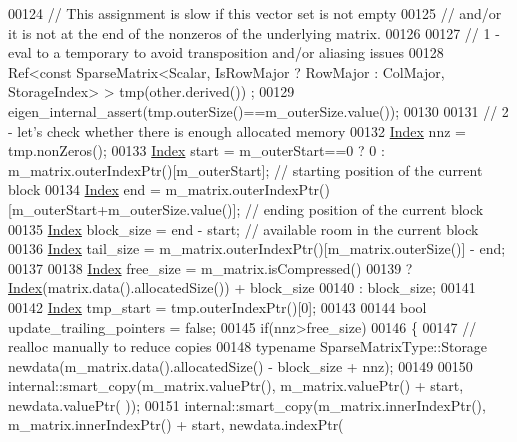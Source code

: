 \begin{DoxyCode}
00124       \textcolor{comment}{// This assignment is slow if this vector set is not empty}
00125       \textcolor{comment}{// and/or it is not at the end of the nonzeros of the underlying matrix.}
00126 
00127       \textcolor{comment}{// 1 - eval to a temporary to avoid transposition and/or aliasing issues}
00128       Ref<const SparseMatrix<Scalar, IsRowMajor ? RowMajor : ColMajor, StorageIndex> > tmp(other.derived())
      ;
00129       eigen\_internal\_assert(tmp.outerSize()==m\_outerSize.value());
00130 
00131       \textcolor{comment}{// 2 - let's check whether there is enough allocated memory}
00132       \hyperlink{namespace_eigen_a62e77e0933482dafde8fe197d9a2cfde}{Index} nnz           = tmp.nonZeros();
00133       \hyperlink{namespace_eigen_a62e77e0933482dafde8fe197d9a2cfde}{Index} start         = m\_outerStart==0 ? 0 : m\_matrix.outerIndexPtr()[m\_outerStart]; \textcolor{comment}{// starting
       position of the current block}
00134       \hyperlink{namespace_eigen_a62e77e0933482dafde8fe197d9a2cfde}{Index} end           = m\_matrix.outerIndexPtr()[m\_outerStart+m\_outerSize.value()]; \textcolor{comment}{// ending
       position of the current block}
00135       \hyperlink{namespace_eigen_a62e77e0933482dafde8fe197d9a2cfde}{Index} block\_size    = end - start;                                                \textcolor{comment}{// available
       room in the current block}
00136       \hyperlink{namespace_eigen_a62e77e0933482dafde8fe197d9a2cfde}{Index} tail\_size     = m\_matrix.outerIndexPtr()[m\_matrix.outerSize()] - end;
00137 
00138       \hyperlink{namespace_eigen_a62e77e0933482dafde8fe197d9a2cfde}{Index} free\_size     = m\_matrix.isCompressed()
00139                           ? \hyperlink{namespace_eigen_a62e77e0933482dafde8fe197d9a2cfde}{Index}(matrix.data().allocatedSize()) + block\_size
00140                           : block\_size;
00141 
00142       \hyperlink{namespace_eigen_a62e77e0933482dafde8fe197d9a2cfde}{Index} tmp\_start = tmp.outerIndexPtr()[0];
00143 
00144       \textcolor{keywordtype}{bool} update\_trailing\_pointers = \textcolor{keyword}{false};
00145       \textcolor{keywordflow}{if}(nnz>free\_size)
00146       \{
00147         \textcolor{comment}{// realloc manually to reduce copies}
00148         \textcolor{keyword}{typename} SparseMatrixType::Storage newdata(m\_matrix.data().allocatedSize() - block\_size + nnz);
00149 
00150         internal::smart\_copy(m\_matrix.valuePtr(),       m\_matrix.valuePtr() + start,      newdata.valuePtr(
      ));
00151         internal::smart\_copy(m\_matrix.innerIndexPtr(),  m\_matrix.innerIndexPtr() + start, newdata.indexPtr(

\end{DoxyCode}

